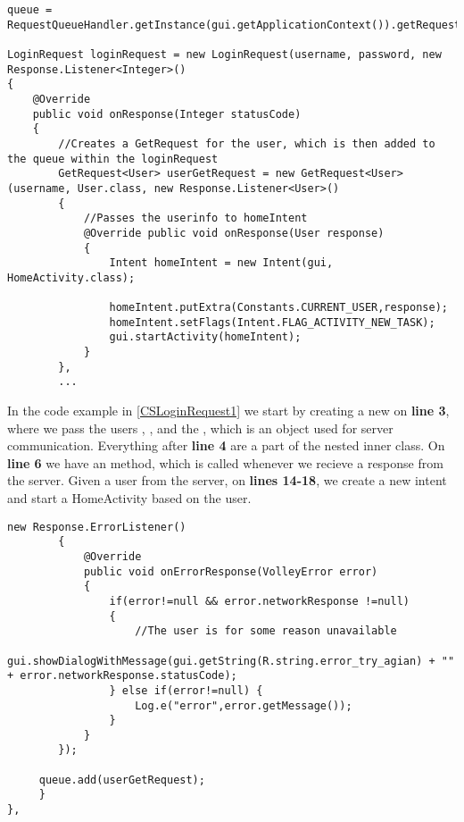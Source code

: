 \begin{minipage}[H]{\linewidth}
\begin{lstlisting}[caption = Initial request the respective server response object, label = CSLoginRequest1]
queue = RequestQueueHandler.getInstance(gui.getApplicationContext()).getRequestQueue();

LoginRequest loginRequest = new LoginRequest(username, password, new Response.Listener<Integer>() 
{
	@Override
    public void onResponse(Integer statusCode) 
    {
    	//Creates a GetRequest for the user, which is then added to the queue within the loginRequest 
    	GetRequest<User> userGetRequest = new GetRequest<User>(username, User.class, new Response.Listener<User>() 
    	{ 
    		//Passes the userinfo to homeIntent 
    		@Override public void onResponse(User response) 
    		{
	            Intent homeIntent = new Intent(gui, HomeActivity.class);
	            
                homeIntent.putExtra(Constants.CURRENT_USER,response);
                homeIntent.setFlags(Intent.FLAG_ACTIVITY_NEW_TASK);
                gui.startActivity(homeIntent);
            }
        },
        ...
\end{lstlisting}
\end{minipage}

In the code example in \autoref{CSLoginRequest1} we start by creating a new
 on \textbf{line 3}, where we pass the users
, , and the , which is
an object used for server communication. Everything after \textbf{line 4} are
a part of the  nested inner class. On \textbf{line 6} we
have an  method, which is called whenever we recieve a
response from the server. Given a user from the server, on \textbf{lines 14-18},
we create a new intent and start a HomeActivity based on the user.\nl

\begin{minipage}[H]{\linewidth}
\begin{lstlisting}[caption = Using an errorListener to detect mishaps in the GetUserRequest, label = CSLoginRequest2]
        new Response.ErrorListener() 
        {
        	@Override
            public void onErrorResponse(VolleyError error) 
            {
            	if(error!=null && error.networkResponse !=null) 
            	{
            		//The user is for some reason unavailable
            	     gui.showDialogWithMessage(gui.getString(R.string.error_try_agian) + "" + error.networkResponse.statusCode);
                } else if(error!=null) {
                	Log.e("error",error.getMessage());
                }
            }
        });
        
     queue.add(userGetRequest);
     }
},
\end{lstlisting}
\end{minipage}

